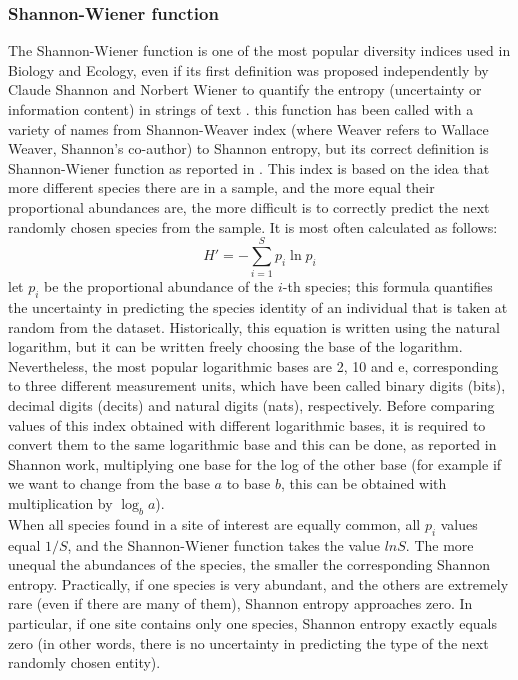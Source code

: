 \subsubsection*{Shannon-Wiener function}
The Shannon-Wiener function is one of the most popular diversity indices used in Biology and Ecology, even if its first definition was proposed independently by Claude Shannon and Norbert Wiener to quantify the entropy (uncertainty or information content) in strings of text \citep{shannon1949mathematical, wiener1948cybernetics}. this function has been called with a variety of names from Shannon-Weaver index (where Weaver refers to Wallace Weaver, Shannon's co-author) to Shannon entropy, but its correct definition is Shannon-Wiener function as reported in \citep{krebsj}. This index is based on the idea that more different species there are in a sample, and the more equal their proportional abundances are, the more difficult is to correctly predict the next randomly chosen species from the sample. It is most often calculated as follows:
\begin{equation*}
H' = -\sum_{i=1}^S p_i \ln p_i
\end{equation*}
let $p_i$ be the proportional abundance of the $i$-th species; this formula quantifies the uncertainty in predicting the species identity of an individual that is taken at random from the dataset. Historically, this equation is written using the natural logarithm, but it can be written freely choosing the base of the logarithm. Nevertheless, the most popular logarithmic bases are 2, 10 and e, corresponding to three different measurement units, which have been called binary digits (bits), decimal digits (decits) and natural digits (nats), respectively. Before comparing values of this index obtained with different logarithmic bases, it is required to convert them to the same logarithmic base and this can be done, as reported in Shannon work, multiplying one base for the log of the other base (for example if we want to change from the base $a$ to base $b$, this can be obtained with multiplication by $\log_{b}a$).\\
When all species found in a site of interest are equally common, all $p_i$ values equal $1/S$, and the Shannon-Wiener function takes the value $ln S$. The more unequal the abundances of the species, the smaller the corresponding Shannon entropy. Practically, if one species is very abundant, and the others are extremely rare (even if there are many of them), Shannon entropy approaches zero. In particular, if one site contains only one species, Shannon entropy exactly equals zero (in other words, there is no uncertainty in predicting the type of the next randomly chosen entity).\\
